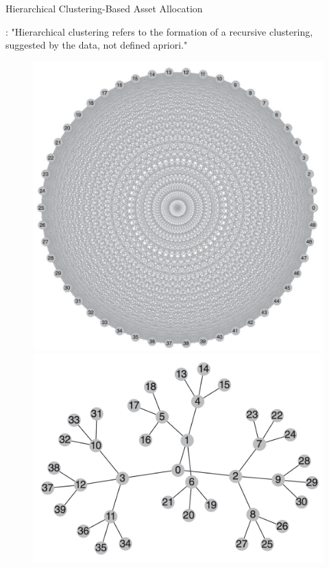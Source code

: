 \begin{frame}{Hierarchical Clustering-Based Asset Allocation}

\citet{de2016building}:  "Hierarchical clustering refers to the formation of a recursive clustering, suggested by the data, not defined apriori."

    
    \begin{figure}
    \centering
    \begin{minipage}{.5\textwidth}
      \centering
      \includegraphics[width=.9\linewidth]{Figures/fuul_matrix.png}
    \end{minipage}%
    \begin{minipage}{.5\textwidth}
      \centering
      \includegraphics[width=.9\linewidth]{Figures/graph.png}
    \end{minipage}
    \end{figure}
\end{frame}


